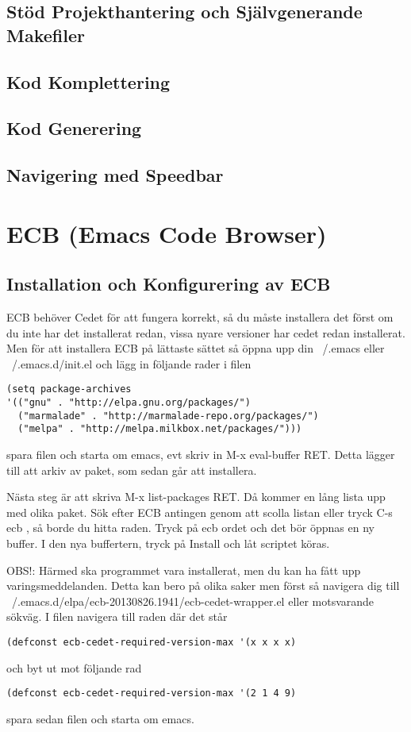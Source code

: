 \documentclass[12pt]{article} %
\begin{document}
\subsection{Stöd Projekthantering och Självgenerande Makefiler}
\newpage
\subsection{Kod Komplettering}
\newpage
\subsection{Kod Generering}
\newpage
\subsection{Navigering med Speedbar}
\newpage

\section{ECB (Emacs Code Browser)}

\subsection{Installation och Konfigurering av ECB}
ECB behöver Cedet för att fungera korrekt, så du måste installera det först om du inte har det installerat redan, vissa nyare versioner har cedet redan installerat. Men för att installera ECB på lättaste sättet så öppna upp din ~/.emacs eller ~/.emacs.d/init.el och lägg in följande rader i filen
\begin{lstlisting}
(setq package-archives 
'(("gnu" . "http://elpa.gnu.org/packages/")
  ("marmalade" . "http://marmalade-repo.org/packages/")
  ("melpa" . "http://melpa.milkbox.net/packages/")))
\end{lstlisting}
spara filen och starta om emacs, evt skriv in M-x eval-buffer RET. Detta lägger till att arkiv av paket, som sedan går att installera.

Nästa steg är att skriva M-x list-packages RET. Då kommer en lång lista upp med olika paket. Sök efter ECB antingen genom att scolla listan eller tryck C-s ecb , så borde du hitta raden. Tryck på ecb ordet och det bör öppnas en ny buffer. I den nya buffertern, tryck på Install och låt scriptet köras.


OBS!: Härmed ska programmet vara installerat, men du kan ha fått upp varingsmeddelanden. Detta kan bero på olika saker men först så navigera dig till ~/.emacs.d/elpa/ecb-20130826.1941/ecb-cedet-wrapper.el eller motsvarande sökväg. I filen navigera till raden där det står \begin{lstlisting}
(defconst ecb-cedet-required-version-max '(x x x x)
\end{lstlisting}
och byt ut mot följande rad
\begin{lstlisting}
(defconst ecb-cedet-required-version-max '(2 1 4 9)
\end{lstlisting}
spara sedan filen och starta om emacs.
\end{document}
